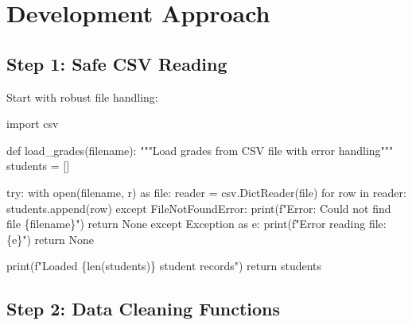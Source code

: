 \documentclass[
  letterpaper,
  DIV=11,
  numbers=noendperiod,
  oneside]{scrreprt}
\newenvironment{Shaded}{}{}
\newcommand{\BuiltInTok}[1]{\textcolor[rgb]{0.84,0.23,0.29}{#1}}
\newcommand{\CommentTok}[1]{\textcolor[rgb]{0.42,0.45,0.49}{#1}}
\newcommand{\ControlFlowTok}[1]{\textcolor[rgb]{0.84,0.23,0.29}{#1}}
\newcommand{\ImportTok}[1]{\textcolor[rgb]{0.01,0.18,0.38}{#1}}
\newcommand{\KeywordTok}[1]{\textcolor[rgb]{0.84,0.23,0.29}{#1}}
\newcommand{\NormalTok}[1]{\textcolor[rgb]{0.14,0.16,0.18}{#1}}
\newcommand{\OperatorTok}[1]{\textcolor[rgb]{0.14,0.16,0.18}{#1}}
\newcommand{\PreprocessorTok}[1]{\textcolor[rgb]{0.84,0.23,0.29}{#1}}
\newcommand{\SpecialCharTok}[1]{\textcolor[rgb]{0.00,0.36,0.77}{#1}}
\newcommand{\SpecialStringTok}[1]{\textcolor[rgb]{0.01,0.18,0.38}{#1}}
\newcommand{\StringTok}[1]{\textcolor[rgb]{0.01,0.18,0.38}{#1}}
\newcommand{\VariableTok}[1]{\textcolor[rgb]{0.89,0.38,0.04}{#1}}
\begin{document}
\section{Development Approach}\label{development-approach-8}

\subsection{Step 1: Safe CSV Reading}\label{step-1-safe-csv-reading}

Start with robust file handling:

\begin{Shaded}
\begin{Highlighting}[]
\ImportTok{import}\NormalTok{ csv}

\KeywordTok{def}\NormalTok{ load\_grades(filename):}
    \CommentTok{"""Load grades from CSV file with error handling"""}
\NormalTok{    students }\OperatorTok{=}\NormalTok{ []}
    
    \ControlFlowTok{try}\NormalTok{:}
        \ControlFlowTok{with} \BuiltInTok{open}\NormalTok{(filename, }\StringTok{\textquotesingle{}r\textquotesingle{}}\NormalTok{) }\ImportTok{as} \BuiltInTok{file}\NormalTok{:}
\NormalTok{            reader }\OperatorTok{=}\NormalTok{ csv.DictReader(}\BuiltInTok{file}\NormalTok{)}
            \ControlFlowTok{for}\NormalTok{ row }\KeywordTok{in}\NormalTok{ reader:}
\NormalTok{                students.append(row)}
    \ControlFlowTok{except} \PreprocessorTok{FileNotFoundError}\NormalTok{:}
        \BuiltInTok{print}\NormalTok{(}\SpecialStringTok{f"Error: Could not find file \textquotesingle{}}\SpecialCharTok{\{}\NormalTok{filename}\SpecialCharTok{\}}\SpecialStringTok{\textquotesingle{}"}\NormalTok{)}
        \ControlFlowTok{return} \VariableTok{None}
    \ControlFlowTok{except} \PreprocessorTok{Exception} \ImportTok{as}\NormalTok{ e:}
        \BuiltInTok{print}\NormalTok{(}\SpecialStringTok{f"Error reading file: }\SpecialCharTok{\{}\NormalTok{e}\SpecialCharTok{\}}\SpecialStringTok{"}\NormalTok{)}
        \ControlFlowTok{return} \VariableTok{None}
    
    \BuiltInTok{print}\NormalTok{(}\SpecialStringTok{f"Loaded }\SpecialCharTok{\{}\BuiltInTok{len}\NormalTok{(students)}\SpecialCharTok{\}}\SpecialStringTok{ student records"}\NormalTok{)}
    \ControlFlowTok{return}\NormalTok{ students}
\end{Highlighting}
\end{Shaded}

\subsection{Step 2: Data Cleaning
Functions}\label{step-2-data-cleaning-functions}
\end{document}
